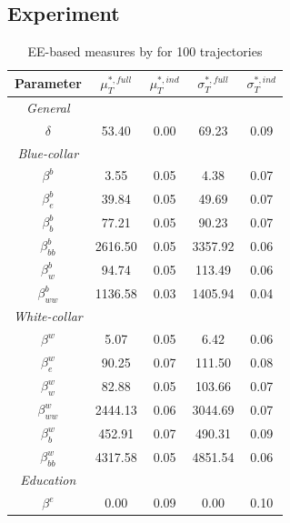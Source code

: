 \documentclass[a4paper,12pt]{article}
\begin{document}
\newpage
\subsection{Experiment \cite{ge2017extending}}
\newpage
\setlength{\tabcolsep}{22pt} %
\begin{table}[H] 
	\centering
	\begin{threeparttable}
		\caption[Model Parametrization]{EE-based measures by \cite{ge2017extending} for 100 trajectories}
		\label{tab:gm17measures_traj}
		\renewcommand{\arraystretch}{1.2}%
		\begin{tabular}{cS[table-format=3.2]S[table-format=3.2]@{\hskip 0.7in}|@{\hskip 0.5in}S[table-format=3.2]S[table-format=3.2]}
			
			{Parameter}     & {$\mu^{*,full}_T$}   & {$\mu^{*,ind}_T$} & {$\sigma^{*,full}_T$} & {$\sigma^{*,ind}_T$}\\ \midrule
			\textit{General} \\
			$\delta$ & 53.40   & 0.00 & 69.23 & 0.09   \\    \midrule
			\textit{Blue-collar}\\    
			$\beta^b$ & 3.55   & 0.05            & 4.38 & 0.07    \\
			$\beta_e^b$ & 39.84  &    0.05        & 49.69  & 0.07    \\
			$\beta^b_b$ & 77.21  & 0.05            & 90.23  & 0.07    \\
			$\beta^b_{bb}$ & 2616.50 & 0.05           & 3357.92  & 0.06     \\
			$\beta^b_w$ & 94.74    & 0.05             & 113.49  &  0.06  \\
			$\beta^b_{ww}$ & 1136.58    & 0.03          & 1405.94 &  0.04    \\ \midrule
			\textit{White-collar}\\
			$\beta^w$ & 5.07   & 0.05            & 6.42 &  0.06   \\
			$\beta^w_e$ & 90.25   & 0.07          & 111.50 &  0.08    \\
			$\beta^w_w$ & 82.88  & 0.05            & 103.66 &  0.07   \\
			$\beta^w_{ww}$ & 2444.13  & 0.06           & 3044.69 & 0.07   \\
			$\beta^w_b$ & 452.91 & 0.07           & 490.31 &  0.09   \\
			$\beta^w_{bb}$ & 4317.58 & 0.05         & 4851.54 &  0.06   \\ \midrule
			\textit{Education} \\
			$\beta^e$     & 0.00    & 0.09             & 0.00&  0.10   \\

\end{tabular}
\end{threeparttable}
\end{table}
\end{document}
